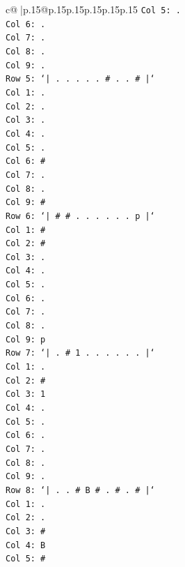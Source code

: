 \documentclass{article}
\begin{document}
{\begin{supertabular}{c@{$\;$}|p{.15\linewidth}@{}p{.15\linewidth}p{.15\linewidth}p{.15\linewidth}p{.15\linewidth}p{.15\linewidth}}
{{{\texttt{Col 5: .} \\
\texttt{Col 6: .} \\
\texttt{Col 7: .} \\
\texttt{Col 8: .} \\
\texttt{Col 9: .} \\
\texttt{Row 5: `| . . . . . \# . . \# |`} \\
\texttt{Col 1: .} \\
\texttt{Col 2: .} \\
\texttt{Col 3: .} \\
\texttt{Col 4: .} \\
\texttt{Col 5: .} \\
\texttt{Col 6: \#} \\
\texttt{Col 7: .} \\
\texttt{Col 8: .} \\
\texttt{Col 9: \#} \\
\texttt{Row 6: `| \# \# . . . . . . p |`} \\
\texttt{Col 1: \#} \\
\texttt{Col 2: \#} \\
\texttt{Col 3: .} \\
\texttt{Col 4: .} \\
\texttt{Col 5: .} \\
\texttt{Col 6: .} \\
\texttt{Col 7: .} \\
\texttt{Col 8: .} \\
\texttt{Col 9: p} \\
\texttt{Row 7: `| . \# 1 . . . . . . |`} \\
\texttt{Col 1: .} \\
\texttt{Col 2: \#} \\
\texttt{Col 3: 1} \\
\texttt{Col 4: .} \\
\texttt{Col 5: .} \\
\texttt{Col 6: .} \\
\texttt{Col 7: .} \\
\texttt{Col 8: .} \\
\texttt{Col 9: .} \\
\texttt{Row 8: `| . . \# B \# . \# . \# |`} \\
\texttt{Col 1: .} \\
\texttt{Col 2: .} \\
\texttt{Col 3: \#} \\
\texttt{Col 4: B} \\
\texttt{Col 5: \#} \\
}}}
\end{supertabular}}
\end{document}
